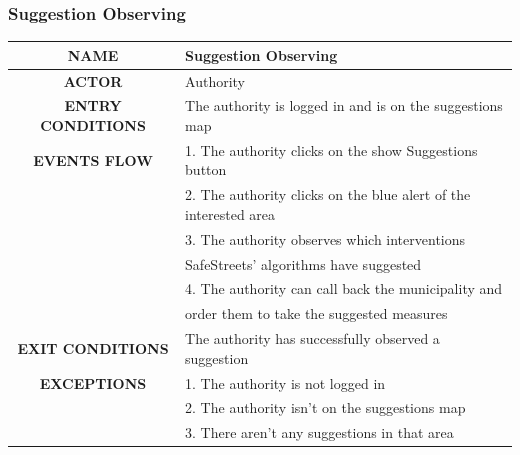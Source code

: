 \documentclass[12pt,a4paper]{article}
\begin{document}
\subsubsection{Suggestion Observing}
\begin{center}
			\begin{tabular}{| c | l |}
				\hline
				\textbf{NAME} & Suggestion Observing\\
				\hline
				\textbf{ACTOR} & Authority \\
				\hline
				\textbf{ENTRY CONDITIONS} & The authority is logged in and is on the suggestions map\\
				\hline
				\textbf{EVENTS FLOW}  &
				1. The authority clicks on the show Suggestions button\\
				&2. The authority clicks on the blue alert of the interested area\\ 
				&3. The authority observes which interventions \\
				& 	SafeStreets' algorithms have suggested \\
				&4. The authority can call back the municipality and \\
				& order them to take the suggested measures\\
				\hline
				\textbf{EXIT CONDITIONS} & The authority has successfully observed a suggestion \\ 
				\hline
				\textbf{EXCEPTIONS} &
				1. The authority is not logged in\\
				&2. The authority isn't on the suggestions map\\
				&3. There aren't any suggestions in that area\\
				\hline
			\end{tabular}
		\end{center}
\end{document}
